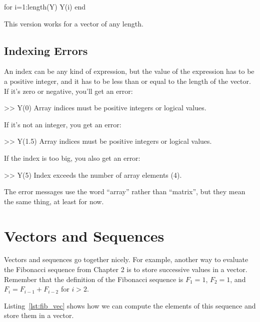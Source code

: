 \begin{code}
for i=1:length(Y)
     Y(i)
end
\end{code}

This version works for a vector of any length.


\subsection{Indexing Errors}


An index can be any kind of expression, but the value of the
expression has to be a positive integer, and it has to be
less than or equal to the length of the vector.  If it's
zero or negative, you'll get an error:

\begin{code}
>> Y(0)
Array indices must be positive integers or logical values.
\end{code}

If it's not an integer, you get an error:

\begin{code}
>> Y(1.5)
Array indices must be positive integers or logical values.
\end{code}

If the index is too big, you also get an error:

\begin{code}
>> Y(5)
Index exceeds the number of array elements (4).
\end{code}

The error messages use the word ``array'' rather than ``matrix'', 
but they mean the same thing, at least for now.


\section{Vectors and Sequences}
\label{vecseq}


Vectors and sequences go together nicely.
For example, another way to evaluate the Fibonacci sequence from Chapter 2 is to
store successive values in a vector.  Remember that the definition of the
Fibonacci sequence is $F_1 = 1$, $F_2 = 1$, and
$F_{i} = F_{i-1} + F_{i-2}$ for $i > 2$.

Listing~\ref{lst:fib_vec} shows how we can compute the elements of this sequence and store them in a vector.

